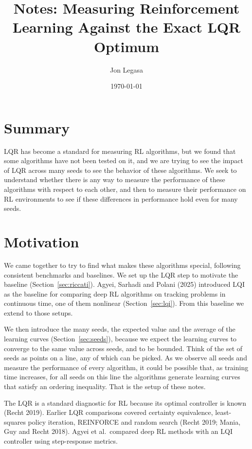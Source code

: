 \documentclass[11pt]{article}
\title{Notes: Measuring Reinforcement Learning Against the Exact LQR Optimum}
\author{Jon Legasa}
\date{\today}
\begin{document}
\maketitle

\section*{Summary}

LQR has become a standard for measuring RL algorithms, but we found that some algorithms have not
been tested on it, and we are trying to see the impact of LQR across many seeds to see the behavior
of these algorithms. We seek to understand whether there is any way to measure the performance of
these algorithms with respect to each other, and then to measure their performance on RL
environments to see if these differences in performance hold even for many seeds.

\section{Motivation}

We came together to try to find what makes these algorithms special, following consistent
benchmarks and baselines. We set up the LQR step to motivate the baseline (Section~\ref{sec:riccati}).
Agyei, Sarhadi and Polani (2025) introduced LQI as the baseline for comparing deep RL algorithms on
tracking problems in continuous time, one of them nonlinear (Section~\ref{sec:lqi}). From this
baseline we extend to those setups.

We then introduce the many seeds, the expected value and the average of the learning curves
(Section~\ref{sec:seeds}), because we expect the learning curves to converge to the same value
across seeds, and to be bounded. Think of the set of seeds as points on a line, any of which can be
picked. As we observe all seeds and measure the performance of every algorithm, it could be possible
that, as training time increases, for all seeds on this line the algorithms generate learning curves
that satisfy an ordering inequality. That is the setup of these notes.

The LQR is a standard diagnostic for RL because its optimal controller is known (Recht 2019).
Earlier LQR comparisons covered certainty equivalence, least-squares policy iteration, REINFORCE and
random search (Recht 2019; Mania, Guy and Recht 2018). Agyei et al.\ compared deep RL methods with an
LQI controller using step-response metrics.
\end{document}
